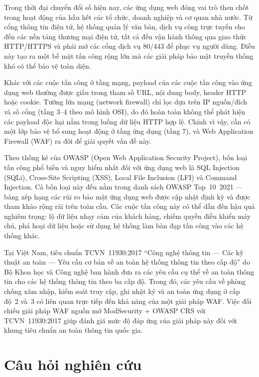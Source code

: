 \documentclass[12pt,a4paper,twoside]{report}
\begin{document}
Trong thời đại chuyển đổi số hiện nay, các ứng dụng web đóng vai trò then chốt trong hoạt động của hầu hết các tổ chức, doanh nghiệp và cơ quan nhà nước. Từ cổng thông tin điện tử, hệ thống quản lý văn bản, dịch vụ công trực tuyến cho đến các nền tảng thương mại điện tử, tất cả đều vận hành thông qua giao thức HTTP/HTTPS và phải mở các cổng dịch vụ 80/443 để phục vụ người dùng. Điều này tạo ra một bề mặt tấn công rộng lớn mà các giải pháp bảo mật truyền thống khó có thể bảo vệ toàn diện.

Khác với các cuộc tấn công ở tầng mạng, payload của các cuộc tấn công vào ứng dụng web thường được giấu trong tham số URL, nội dung body, header HTTP hoặc cookie. Tường lửa mạng (network firewall) chỉ lọc dựa trên IP nguồn/đích và số cổng (tầng 3--4 theo mô hình OSI), do đó hoàn toàn không thể phát hiện các payload độc hại nằm trong luồng dữ liệu HTTP hợp lệ. Chính vì vậy, cần có một lớp bảo vệ bổ sung hoạt động ở tầng ứng dụng (tầng 7), và Web Application Firewall (WAF) ra đời để giải quyết vấn đề này.

Theo thống kê của OWASP (Open Web Application Security Project), bốn loại tấn công phổ biến và nguy hiểm nhất đối với ứng dụng web là SQL Injection (SQLi), Cross-Site Scripting (XSS), Local File Inclusion (LFI) và Command Injection. Cả bốn loại này đều nằm trong danh sách OWASP Top~10~2021 --- bảng xếp hạng các rủi ro bảo mật ứng dụng web được cập nhật định kỳ và được tham khảo rộng rãi trên toàn cầu. Các cuộc tấn công này có thể dẫn đến hậu quả nghiêm trọng: lộ dữ liệu nhạy cảm của khách hàng, chiếm quyền điều khiển máy chủ, phá hoại dữ liệu hoặc sử dụng hệ thống làm bàn đạp tấn công vào các hệ thống khác.

Tại Việt Nam, tiêu chuẩn TCVN~11930:2017 ``Công nghệ thông tin --- Các kỹ thuật an toàn --- Yêu cầu cơ bản về an toàn hệ thống thông tin theo cấp độ'' do Bộ Khoa học và Công nghệ ban hành đưa ra các yêu cầu cụ thể về an toàn thông tin cho các hệ thống thông tin theo ba cấp độ. Trong đó, các yêu cầu về phòng chống xâm nhập, kiểm soát truy cập, ghi nhật ký và an toàn ứng dụng ở cấp độ~2 và~3 có liên quan trực tiếp đến khả năng của một giải pháp WAF. Việc đối chiếu giải pháp WAF nguồn mở ModSecurity + OWASP CRS với TCVN~11930:2017 giúp đánh giá mức độ đáp ứng của giải pháp này đối với khung tiêu chuẩn an toàn thông tin quốc gia.

\section{Câu hỏi nghiên cứu}
\end{document}
